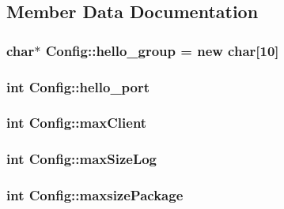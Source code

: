 \subsection{Member Data Documentation}
\hypertarget{structConfig_a2b1264000682b7de201becb6e6fb919d}{
\subsubsection[{hello\-\_\-group}]{\setlength{\rightskip}{0pt plus 5cm}char$\ast$ Config\-::hello\-\_\-group = new char\mbox{[}10\mbox{]}}}\label{structConfig_a2b1264000682b7de201becb6e6fb919d}
\hypertarget{structConfig_afc8ae6cab0cd9fa1ea54ca13bacd56ea}{
\subsubsection[{hello\-\_\-port}]{\setlength{\rightskip}{0pt plus 5cm}int Config\-::hello\-\_\-port}}\label{structConfig_afc8ae6cab0cd9fa1ea54ca13bacd56ea}
\hypertarget{structConfig_aadd14c1e063b456e777c398219b642a9}{
\subsubsection[{max\-Client}]{\setlength{\rightskip}{0pt plus 5cm}int Config\-::max\-Client}}\label{structConfig_aadd14c1e063b456e777c398219b642a9}
\hypertarget{structConfig_ae222198df930699e0cfc29ef7223cc2d}{
\subsubsection[{max\-Size\-Log}]{\setlength{\rightskip}{0pt plus 5cm}int Config\-::max\-Size\-Log}}\label{structConfig_ae222198df930699e0cfc29ef7223cc2d}
\hypertarget{structConfig_a50401aecbdf6fa6a092b8769bdd56826}{
\subsubsection[{maxsize\-Package}]{\setlength{\rightskip}{0pt plus 5cm}int Config\-::maxsize\-Package}}\label{structConfig_a50401aecbdf6fa6a092b8769bdd56826}
